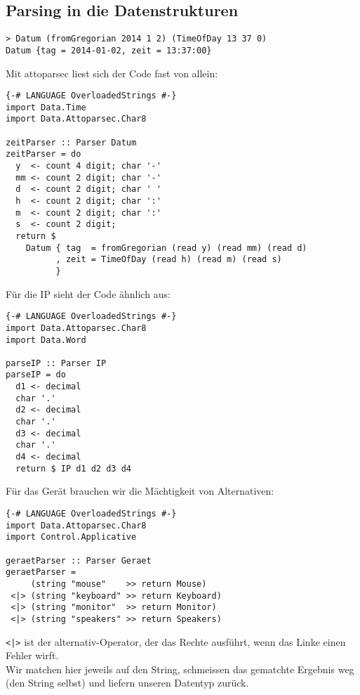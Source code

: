 \documentclass{beamer}
\begin{document}
\subsection{Parsing in die Datenstrukturen}
\begin{frame}[fragile]
\begin{verbatim}
> Datum (fromGregorian 2014 1 2) (TimeOfDay 13 37 0)
Datum {tag = 2014-01-02, zeit = 13:37:00}
\end{verbatim}
\pause
Mit attoparsec liest sich der Code fast von allein:
\small
\begin{verbatim}
{-# LANGUAGE OverloadedStrings #-}
import Data.Time
import Data.Attoparsec.Char8

zeitParser :: Parser Datum
zeitParser = do
  y  <- count 4 digit; char '-'
  mm <- count 2 digit; char '-'
  d  <- count 2 digit; char ' '
  h  <- count 2 digit; char ':'
  m  <- count 2 digit; char ':'
  s  <- count 2 digit;
  return $
    Datum { tag  = fromGregorian (read y) (read mm) (read d)
          , zeit = TimeOfDay (read h) (read m) (read s)
          }
\end{verbatim}
\normalsize

\end{frame}

\begin{frame}[fragile]
Für die IP sieht der Code ähnlich aus:
\small
\begin{verbatim}
{-# LANGUAGE OverloadedStrings #-}
import Data.Attoparsec.Char8
import Data.Word

parseIP :: Parser IP
parseIP = do
  d1 <- decimal
  char '.'
  d2 <- decimal
  char '.'
  d3 <- decimal
  char '.'
  d4 <- decimal
  return $ IP d1 d2 d3 d4
\end{verbatim}
\normalsize
\end{frame}

\begin{frame}[fragile]
Für das Gerät brauchen wir die Mächtigkeit von Alternativen:
\small
\begin{verbatim}
{-# LANGUAGE OverloadedStrings #-}
import Data.Attoparsec.Char8
import Control.Applicative

geraetParser :: Parser Geraet
geraetParser =
     (string "mouse"    >> return Mouse)
 <|> (string "keyboard" >> return Keyboard)
 <|> (string "monitor"  >> return Monitor)
 <|> (string "speakers" >> return Speakers)
\end{verbatim}
\normalsize
\texttt{<|>} ist der alternativ-Operator, der das Rechte ausführt, wenn das Linke einen Fehler wirft.\\
\pause
Wir matchen hier jeweils auf den String, schmeissen das gematchte Ergebnis weg (den String selbst) und liefern unseren Datentyp zurück.
\end{frame}
\end{document}
